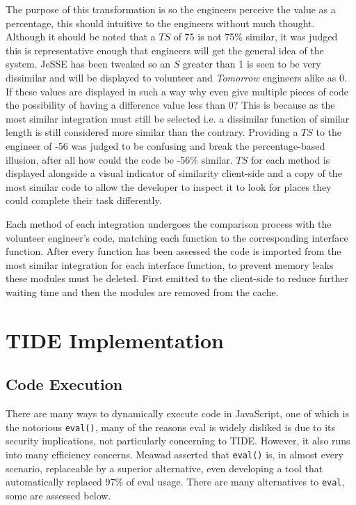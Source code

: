 \documentclass[jou,apacite]{apa6}
\begin{document}
The purpose of this transformation is so the engineers perceive the value as a percentage, this should intuitive to the engineers without much thought. Although it should be noted that a $TS$ of 75 is not 75\% similar, it was judged this is representative enough that engineers will get the general idea of the system. JeSSE has been tweaked so an $S$ greater than 1 is seen to be very dissimilar and will be displayed to volunteer and \textit{Tomorrow} engineers alike as 0. If these values are displayed in such a way why even give multiple pieces of code the possibility of having a difference value less than 0? This is because as the most similar integration must still be selected i.e. a dissimilar function of similar length is still considered more similar than the contrary. Providing a $TS$ to the engineer of -56 was judged to be confusing and break the percentage-based illusion, after all how could the code be -56\% similar. $TS$ for each method is displayed alongside a visual indicator of similarity client-side and a copy of the most similar code to allow the developer to inspect it to look for places they could complete their task differently. 

Each method of each integration undergoes the comparison process with the volunteer engineer's code, matching each function to the corresponding interface function. After every function has been assessed the code is imported from the most similar integration for each interface function, to prevent memory leaks these modules must be deleted. First emitted to the client-side to reduce further waiting time and then the modules are removed from the cache.

\clearpage

\section{TIDE Implementation}
\subsection{Code Execution}
There are many ways to dynamically execute code in JavaScript, one of which is the notorious \texttt{eval()}, many of the reasons eval is widely disliked is due to its security implications, not particularly concerning to TIDE. However,  it also runs into many efficiency concerns. Meawad \cite{Meawad2012} asserted that \texttt{eval()} is, in almost every scenario, replaceable by a superior alternative, even developing a tool that automatically replaced 97\% of eval usage. There are many alternatives to \texttt{eval}, some are assessed below.
\end{document}

